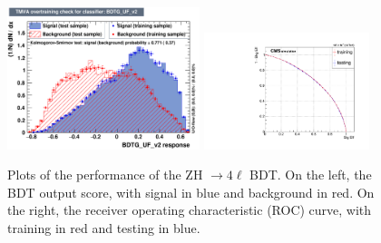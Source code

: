 \begin{figure}[!htb]
    \centering
    \captionsetup{justification=justified}
    \includegraphics[width=0.50\textwidth]{pics/VH_sec/BDT_train_ZH/ZH_BDT_overtrain.pdf}
    \includegraphics[width=0.43\textwidth]{pics/VH_sec/BDT_train_ZH/ZH_BDT_ROC.pdf}
    \caption{Plots of the performance of the ZH $\to 4\ell$ BDT.
             On the left, the BDT output score, with signal in blue and background in red.  
             On the right, the receiver operating characteristic (ROC) curve, 
             with training in red and testing in blue.}
    \label{fig:zh_BDT_out}
\end{figure}

